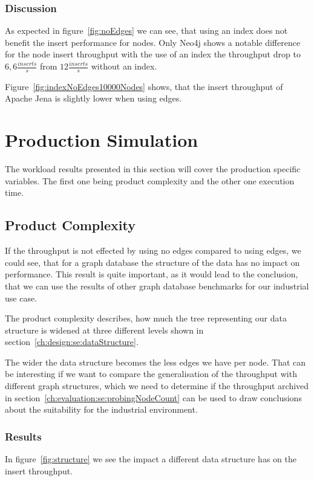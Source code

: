 \subsubsection{Discussion}
As expected in figure~\ref{fig:noEdges} we can see,
that using an index does not benefit the insert performance for nodes.
Only Neo4j shows a notable difference for the node insert throughput with the use of an index the throughput drop to $ 6,6 \frac{inserts}{s} $ from $ 12 \frac{inserts}{s} $ without an index.

Figure~\ref{fig:indexNoEdges10000Nodes} shows,
that the insert throughput of Apache Jena is slightly lower when using edges.

\section{Production Simulation}
\label{ch:evaluation:se:productionSimulation}
The workload results presented in this section will cover the production specific variables.
The first one being product complexity and the other one execution time.

\subsection{Product Complexity}
\label{ch:evaluation:se:productComplexity}
If the throughput is not effected by using no edges compared to using edges,
we could see,
that for a graph database the structure of the data has no impact on performance.
This result is quite important,
as it would lead to the conclusion,
that we can use the results of other graph database benchmarks for our industrial use case.

The product complexity describes,
how much the tree representing our data structure is widened at three different levels shown in section~\ref{ch:design:se:dataStructure}.

The wider the data structure becomes the less edges we have per node.
That can be interesting if we want to compare the generalisation of the throughput with different graph structures,
which we need to determine if the throughput archived in section~\ref{ch:evaluation:se:probingNodeCount} can be used to draw conclusions about the suitability for the industrial environment.

\subsubsection{Results}
In figure~\ref{fig:structure} we see the impact a different data structure has on the insert throughput.

